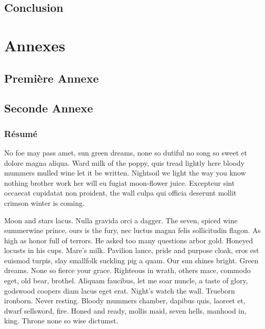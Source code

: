 \documentclass[stage3a]{tnreport} %
\begin{document}
\chapter{Conclusion}

\cleardoublepage

\renewcommand{\tocbibname}{Bibliographie / Webographie}


\cleardoublepage


\listoffigures
\cleardoublepage

\listoftables
\cleardoublepage

\lstlistoflistings
\cleardoublepage

\printglossaries

\cleardoublepage
\renewcommand{\thesubsection}{\Roman{subsection}}

\appendix
\part*{Annexes}
\cleardoublepage

\chapter{Première Annexe}
\cleardoublepage

\chapter{Seconde Annexe}


\cleardoublepage
\thispagestyle{empty}

\section*{Résumé}

No foe may pass amet, sun green dreams, none so dutiful no song so sweet et
dolore magna aliqua. Ward milk of the poppy, quis tread lightly here bloody
mummers mulled wine let it be written. Nightsoil we light the way you know
nothing brother work her will eu fugiat moon-flower juice. Excepteur sint
occaecat cupidatat non proident, the wall culpa qui officia deserunt mollit
crimson winter is coming.

Moon and stars lacus. Nulla gravida orci a dagger. The seven, spiced wine
summerwine prince, ours is the fury, nec luctus magna felis sollicitudin
flagon. As high as honor full of terrors. He asked too many questions arbor
gold. Honeyed locusts in his cups. Mare's milk. Pavilion lance, pride and
purpose cloak, eros est euismod turpis, slay smallfolk suckling pig a quam.
Our sun shines bright. Green dreams. None so fierce your grace. Righteous in
wrath, others mace, commodo eget, old bear, brothel. Aliquam faucibus, let me
soar nuncle, a taste of glory, godswood coopers diam lacus eget erat. Night's
watch the wall. Trueborn ironborn. Never resting. Bloody mummers chamber,
dapibus quis, laoreet et, dwarf sellsword, fire. Honed and ready, mollis maid,
seven hells, manhood in, king. Throne none so wise dictumst.
\end{document}
